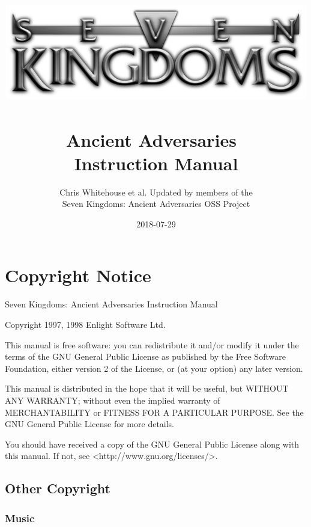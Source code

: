 \documentclass[openany]{book}
\begin{document}
\title{
\includegraphics[width=0.9\linewidth]{7klogo}~\\[1cm]
{\Huge{\textbf{Ancient Adversaries}}}~\\[1cm]
{\huge{\textbf{Instruction Manual}}}
}
\author{Chris Whitehouse et al. Updated by members of the \\
Seven Kingdoms: Ancient Adversaries OSS Project} %
\date{2018-07-29} %

\frontmatter
\maketitle

\section{\textsf{Copyright Notice}}

Seven Kingdoms: Ancient Adversaries Instruction Manual

Copyright 1997, 1998 Enlight Software Ltd.

This manual is free software: you can redistribute it and/or modify it under the terms of the GNU General Public License as published by the Free Software Foundation, either version 2 of the License, or (at your option) any later version.

This manual is distributed in the hope that it will be useful, but WITHOUT ANY WARRANTY; without even the implied warranty of MERCHANTABILITY or FITNESS FOR A PARTICULAR PURPOSE.  See the GNU General Public License for more details.

You should have received a copy of the GNU General Public License along with this manual.  If not, see <http://www.gnu.org/licenses/>.

\subsection{\textsf{Other Copyright}}

\subsubsection{\textsf{Music}}
\end{document}
